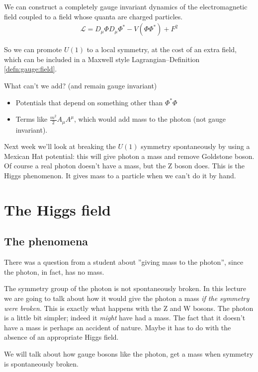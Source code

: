 \documentclass[]{article}
\begin{document}
We can construct a completely gauge invariant dynamics of the electromagnetic field coupled to a field whose quanta are charged particles.
\begin{align*}
	\mathcal{L} = D_\mu \Phi D_\mu \Phi^* -V(\Phi\Phi^*) + F^2
\end{align*}

So we can promote $U(1)$ to a local symmetry, at the cost of an extra field, which can be included in a Maxwell style Lagrangian--Definition \ref{defn:gauge:field}.

What can't we add? (and remain gauge invariant)

\begin{itemize}
	\item Potentials that depend on something other than $\Phi^*\Phi$ 
	\item Terms like $\frac{m^2}{2}A_\mu A^\mu$, which would add mass to the photon (not gauge invariant).
\end{itemize}

Next week we'll look at breaking the $U(1)$ symmetry spontaneously by using a Mexican Hat potential: this will give photon a mass and remove Goldstone boson. Of course a real photon doesn't have a mass, but the Z boson does. This is the Higgs phenomenon. It gives mass to a particle when we can't do it by hand.

\section{The Higgs field}

\subsection{The phenomena}

There was a question from a student about ''giving mass to the photon'', since the photon, in fact, has no mass.

The symmetry group of the photon is not spontaneously broken. In this lecture we are going to talk about how it would give the photon a mass \emph{if the symmetry were broken}. This is exactly what happens with the Z and  W bosons. The photon is a little bit simpler; indeed it \emph{might} have had a mass. The fact that it doesn't have a mass is perhaps an accident of nature. Maybe it has to do with the absence of an appropriate Higgs field.

We will talk about how gauge bosons like the photon, get a mass when symmetry is spontaneously broken.
\end{document}
